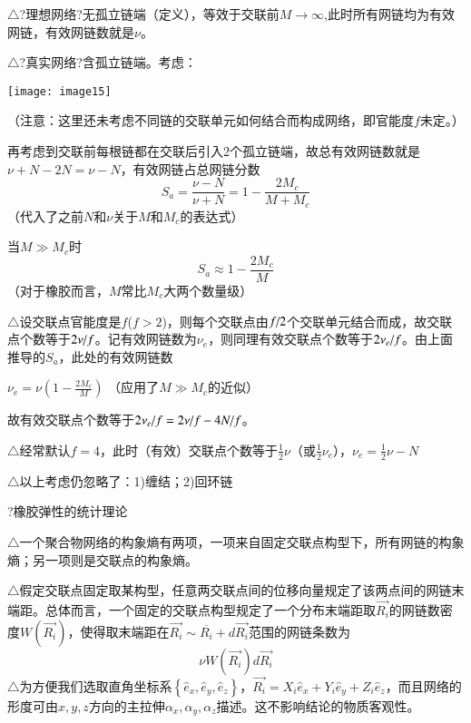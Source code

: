 \documentclass{article} %
\begin{document}
\noindent $\mathrm{\triangle}$?理想网络?无孤立链端（定义），等效于交联前$M\to \infty $,此时所有网链均为有效网链，有效网链数就是$\nu $。

\noindent $\mathrm{\triangle}$?真实网络?含孤立链端。考虑：

\noindent \texttt{[image: image15]}

\noindent （注意：这里还未考虑不同链的交联单元如何结合而构成网络，即官能度$f$未定。）

\noindent 再考虑到交联前每根链都在交联后引入2个孤立链端，故总有效网链数就是$\nu +N-2N=\nu -N$，有效网链占总网链分数
\[S_{a} =\frac{\nu -N}{\nu +N} =1-\frac{2M_{c} }{M+M_{c} } \] 
（代入了之前$N$和$\nu $关于$M$和$M_{c} $的表达式）

\noindent 当$M\gg M_{c} $时
\[S_{a} \approx 1-\frac{2M_{c} }{M} \] 
（对于橡胶而言，$M$常比$M_{c} $大两个数量级）

\noindent $\mathrm{\triangle}$设交联点官能度是$f$($f>2$)，则每个交联点由${f\mathord{\left/ {\vphantom {f 2}} \right. \kern-\nulldelimiterspace} 2} $个交联单元结合而成，故交联点个数等于${2\nu \mathord{\left/ {\vphantom {2\nu  f}} \right. \kern-\nulldelimiterspace} f} $。记有效网链数为$\nu _{e} $，则同理有效交联点个数等于${2\nu _{e} \mathord{\left/ {\vphantom {2\nu _{e}  f}} \right. \kern-\nulldelimiterspace} f} $。由上面推导的$S_{a} $，此处的有效网链数

 $\nu _{e} =\nu (1-\frac{2M_{c} }{M} )$ （应用了$M\gg M_{c} $的近似）

\noindent 故有效交联点个数等于${2\nu _{e} \mathord{\left/ {\vphantom {2\nu _{e}  f}} \right. \kern-\nulldelimiterspace} f} ={2\nu \mathord{\left/ {\vphantom {2\nu  f}} \right. \kern-\nulldelimiterspace} f} -{4N\mathord{\left/ {\vphantom {4N f}} \right. \kern-\nulldelimiterspace} f} $。

\noindent $\mathrm{\triangle}$经常默认$f=4$，此时（有效）交联点个数等于$\frac{1}{2} \nu $（或$\frac{1}{2} \nu _{e} $），$\nu _{e} =\frac{1}{2} \nu -N$

\noindent $\mathrm{\triangle}$以上考虑仍忽略了：1)缠结；2)回环链

\noindent ?橡胶弹性的统计理论

\noindent $\mathrm{\triangle}$一个聚合物网络的构象熵有两项，一项来自固定交联点构型下，所有网链的构象熵；另一项则是交联点的构象熵。

\noindent $\mathrm{\triangle}$假定交联点固定取某构型，任意两交联点间的位移向量规定了该两点间的网链末端距。总体而言，一个固定的交联点构型规定了一个分布末端距取$\overrightarrow{R_{i} }$的网链数密度$W\left(\overrightarrow{R_{i} }\right)$，使得取末端距在$\overrightarrow{R_{i} }\sim \overline{R_{i} }+d\overrightarrow{R_{i} }$范围的网链条数为
\[\nu W\left(\overrightarrow{R_{i} }\right)d\overrightarrow{R_{i} }\] 
$\mathrm{\triangle}$为方便我们选取直角坐标系$\left\{\widehat{e}_{x} ,\widehat{e}_{y} ,\widehat{e}_{z} \right\}$，$\overrightarrow{R_{i} }=X_{i} \widehat{e}_{x} +Y_{i} \widehat{e}_{y} +Z_{i} \widehat{e}_{z} $，而且网络的形度可由$x,y,z$方向的主拉伸$\alpha _{x} ,\alpha _{y} ,\alpha _{z} $描述。这不影响结论的物质客观性。
\end{document}
